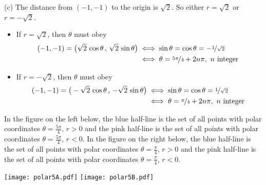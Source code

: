 \begin{solution}
(c)
The distance from $(-1,-1)$ to the origin is $\sqrt{2}$. 
So either $r=\sqrt{2}$ or $r=-\sqrt{2}$.
\begin{itemize}
\item If $r=\sqrt{2}$, then $\theta$ must obey 
\begin{align*}
(-1,-1) = \big(\sqrt{2}\,\cos\theta\,,\,\sqrt{2}\,\sin\theta\big)
&\iff \sin\theta=\cos\theta=-\nicefrac{1}{\sqrt{2}} \\
&\iff \theta= \nicefrac{5\pi}{4} + 2n\pi,\ n\text{ integer }
\end{align*}
\item If $r=-\sqrt{2}$, then $\theta$ must obey 
\begin{align*}
(-1,-1) = \big(-\sqrt{2}\,\cos\theta\,,\,-\sqrt{2}\,\sin\theta\big)
&\iff \sin\theta=\cos\theta=\nicefrac{1}{\sqrt{2}} \\
&\iff \theta= \nicefrac{\pi}{4} + 2n\pi,\ n\text{ integer }
\end{align*}
\end{itemize}
In the figure on the left below, the blue half-line is the set of all points 
with polar coordinates $\theta=\frac{5\pi}{4}$, $r>0$ and the pink half-line 
is the set of all points  with polar coordinates 
$\theta=\frac{5\pi}{4}$, $r<0$. 
In the figure on the right below, the blue half-line is the set of all points 
with polar coordinates $\theta=\frac{\pi}{4}$, $r>0$ and the pink 
half-line is the set of all points  with polar coordinates 
$\theta=\frac{\pi}{4}$, $r<0$. 
\begin{center}
  \texttt{[image: polar5A.pdf]}\qquad
  \texttt{[image: polar5B.pdf]}
\end{center}

\end{solution}



